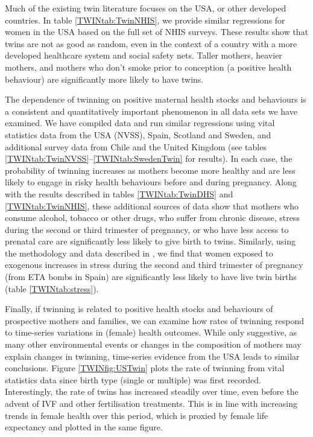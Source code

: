 Much of the existing twin literature focuses on the USA, or other developed
countries. In table \ref{TWINtab:TwinNHIS}, we provide similar regressions for 
women in the USA based on the full set of NHIS surveys.  These results show
that twins are not as good as random, even in the context of a country with 
a more developed healthcare system and social safety nets. Taller mothers,
heavier mothers, and mothers who don't smoke prior to conception (a positive
health behaviour) are significantly more likely to have twins.

The dependence of twinning on positive maternal health stocks and behaviours is
a consistent and quantitatively important phenomenon in all data sets we have
examined.  We have compiled data and run similar regressions using vital 
statistics data from the USA (NVSS), Spain, Scotland and Sweden, and 
additional survey data from Chile and the United Kingdom (see tables 
\ref{TWINtab:TwinNVSS}--\ref{TWINtab:SwedenTwin} for results).  In each case,
the probability of twinning increases as mothers become more healthy and are
less likely to engage in risky health behaviours before and during pregnancy.
Along with the results described in tables \ref{TWINtab:TwinDHS} and 
\ref{TWINtab:TwinNHIS}, these additional sources of data show that mothers
who consume alcohol, tobacco or other drugs, who suffer from chronic disease,
stress during the second or third trimester of pregnancy, or who have less 
access to prenatal care are significantly less likely to give birth to twins.
Similarly, using the methodology and data described in 
\citet{QuintanaRodenas2014}, we find that women exposed to exogenous increases
in stress during the second and third trimester of pregnancy (from ETA bombs in 
Spain) are significantly less likely to have live twin births (table 
\ref{TWINtab:stress}).

Finally, if twinning is related to positive health stocks and behaviours of
prospective mothers and families, we can examine how rates of twinning respond
to time-series variations in (female) health outcomes.  While only suggestive,
as many other environmental events or changes in the composition of mothers may 
explain changes in twinning, time-series evidence from the USA leads to similar 
conclusions.  Figure
\ref{TWINfig:USTwin} plots the rate of twinning from vital statistics data since
birth type (single or multiple) was first recorded.  Interestingly, the rate of
twins has increased steadily over time, even before the advent of IVF and other
fertilisation treatments.  This is in line with increasing trends in female
health over this period, which is proxied by female life expectancy and plotted
in the same figure.


